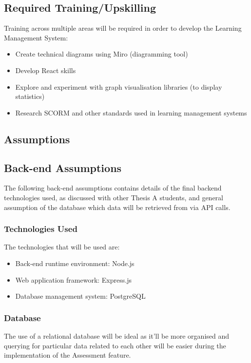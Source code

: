 \subsection{Required Training/Upskilling}
Training across multiple areas will be required in order to develop the Learning Management System:

\begin{itemize}
	\item Create technical diagrams using Miro (diagramming tool)
	\item Develop React skills
	\item Explore and experiment with graph visualisation libraries (to display statistics)
	\item Research SCORM and other standards used in learning management systems
\end{itemize}

\subsection{Assumptions}
\subsection{Back-end Assumptions}
The following back-end assumptions contains details of the final backend technologies used, as discussed with other Thesis A students, and general assumption of the database which data will be retrieved from via API calls. 

\subsubsection{Technologies Used}
The technologies that will be used are:
\begin{itemize}
	\item Back-end runtime environment: Node.js
	\item Web application framework: Express.js
	\item Database management system: PostgreSQL
\end{itemize}

\subsubsection{Database}
The use of a relational database will be ideal as it'll be more organised and querying for particular data related to each other will be easier during the implementation of the Assessment feature. 

